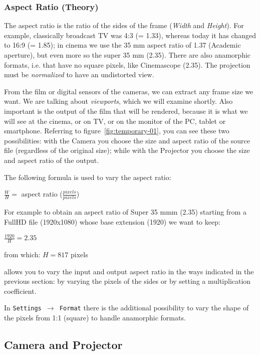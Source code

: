 \subsubsection*{Aspect Ratio (Theory)}%
\label{ssub:aspect_ratio_theory}

The aspect ratio is the ratio of the sides of the frame (\textit{Width} and \textit{Height}). For example, classically broadcast TV was 4:3 (= 1.33), whereas today it has changed to 16:9 (= 1.85); in cinema we use the 35 mm aspect ratio of 1.37 (Academic aperture), but even more so the super 35 mm (2.35). There are also anamorphic formats, i.e. that have no square pixels, like Cinemascope (2.35). The projection must be \textit{normalized} to have an undistorted view.

From the film or digital sensors of the cameras, we can extract any frame size we want. We are talking about \textit{viewports}, which we will examine shortly. Also important is the output of the film that will be rendered, because it is what we will see at the cinema, or on TV, or on the monitor of the PC, tablet or smartphone. Referring to figure~\ref{fig:temporary-01}, you can see these two possibilities: with the Camera you choose the size and aspect ratio of the source file (regardless of the original size); while with the Projector you choose the size and aspect ratio of the output.

The following formula is used to vary the aspect ratio:

\qquad $\frac{W}{H} =$ aspect ratio ($\frac{pixels}{pixels}$)

For example to obtain an aspect ratio of Super 35 mmm (2.35) starting from a FullHD file (1920x1080) whose base extension (1920) we want to keep:

\qquad $\frac{1920}{H} = 2.35$

from which: $H = 817$ pixels

\CGG{} allows you to vary the input and output aspect ratio in the ways indicated in the previous section: by varying the pixels of the sides or by setting a multiplication coefficient.

In \texttt{Settings $\rightarrow$ Format} there is the additional possibility to vary the shape of the pixels from 1:1 (square) to handle anamorphic formats.

\subsection{Camera and Projector}%
\label{sub:camera_and_projector}

